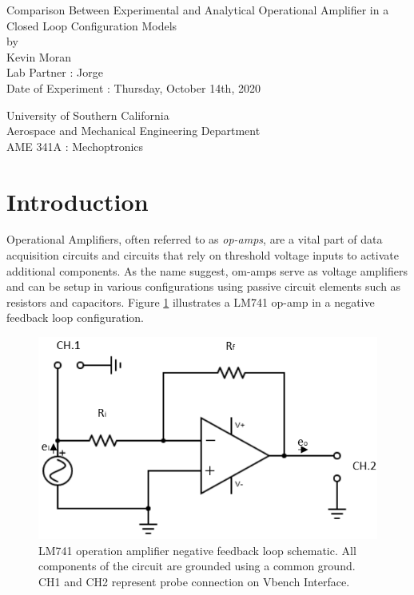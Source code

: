 \documentclass[letterpaper,12pt]{article}
\begin{document}
\begin{titlepage}
 \begin{center}
 \vspace*{1in}
{\Huge Comparison Between Experimental and Analytical Operational Amplifier in a Closed Loop Configuration Models}\\
    \bigskip
    by\\
    \bigskip
    {\Large Kevin Moran} \\
    \bigskip
    Lab Partner : Jorge\\
    Date of Experiment : Thursday, October 14th, 2020

    \bigskip\bigskip\bigskip
    University of Southern California\\
    Aerospace and Mechanical Engineering Department\\
    AME 341A : Mechoptronics
 \end{center}
\end{titlepage}




\section{Introduction}
Operational Amplifiers, often referred to as \textit{op-amps}, are a vital part of data acquisition circuits and circuits that rely on threshold voltage inputs to activate additional components. As the name suggest, om-amps serve as voltage amplifiers and can be setup in various configurations using passive circuit elements such as resistors and capacitors. Figure \ref{NFL} illustrates a LM741 op-amp in a negative feedback loop configuration.

\begin{figure}[ht]
    \centering
    \includegraphics[scale=1.25]{feedback.png}
    \caption{\small LM741 operation amplifier negative feedback loop schematic. All components of the circuit are grounded using a common ground. CH1 and CH2 represent probe connection on Vbench Interface.}
    \label{NFL}
\end{figure}
\end{document}
